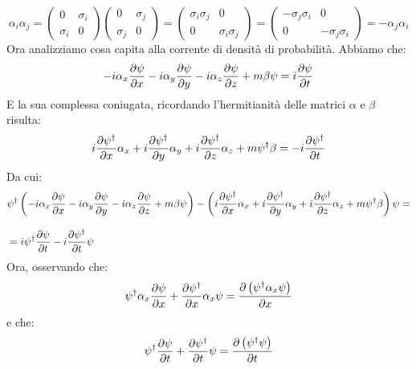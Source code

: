 \begin{equation}
  \alpha_i \alpha_j =
  \begin{pmatrix}
    0 & \sigma_i \\
    \sigma_i & 0
  \end{pmatrix}
  \begin{pmatrix}
    0 & \sigma_j \\
    \sigma_j & 0
  \end{pmatrix} =
  \begin{pmatrix}
    \sigma_i\sigma_j & 0 \\
    0 & \sigma_i\sigma_j
  \end{pmatrix} =
  \begin{pmatrix}
    -\sigma_j\sigma_i & 0 \\
    0 & -\sigma_j\sigma_i
  \end{pmatrix} = -\alpha_j \alpha_i
\end{equation}
Ora analizziamo cosa capita alla corrente di densità di probabilità. Abbiamo che:
\begin{equation}
  -i\alpha_x\pdv{\psi}{x} -i\alpha_y\pdv{\psi}{y} -i\alpha_z\pdv{\psi}{z} + m\beta\psi = i\pdv{\psi}{t}
\end{equation}
E la sua complessa coniugata, ricordando l'hermitianità delle matrici $\alpha$ e $\beta$ risulta:
\begin{equation}
  i\pdv{\psi^\dagger}{x}\alpha_x + i\pdv{\psi^\dagger}{y}\alpha_y + i\pdv{\psi^\dagger}{z}\alpha_z + m\psi^\dagger\beta = -i\pdv{\psi^\dagger }{t}
\end{equation}
Da cui:
\begin{equation}
  \begin{split}
    &\psi^\dagger\brackets{-i\alpha_x\pdv{\psi}{x} -i\alpha_y\pdv{\psi}{y} -i\alpha_z\pdv{\psi}{z} + m\beta\psi} - \brackets{i\pdv{\psi^\dagger}{x}\alpha_x + i\pdv{\psi^\dagger}{y}\alpha_y + i\pdv{\psi^\dagger}{z}\alpha_z + m\psi^\dagger\beta}\psi = \\[8pt]&= i\psi^\dagger\pdv{\psi}{t}-i\pdv{\psi^\dagger }{t}\psi
  \end{split}
\end{equation}
Ora, osservando che:
\begin{equation}
  \psi^\dagger\alpha_x\pdv{\psi}{x} + \pdv{\psi^\dagger}{x}\alpha_x\psi= \pdv{\brackets{\psi^\dagger\alpha_x\psi}}{x}
\end{equation}
e che:
\begin{equation}
  \psi^\dagger\pdv{\psi}{t} + \pdv{\psi^\dagger}{t}\psi = \pdv{\brackets{\psi^\dagger\psi}}{t}
\end{equation}
